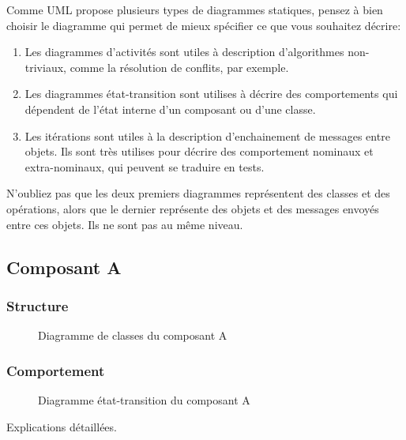 Comme UML propose plusieurs types de diagrammes statiques, pensez à bien choisir le diagramme qui permet de mieux spécifier ce que vous souhaitez décrire:
\begin{enumerate}
	\item Les diagrammes d'activités sont utiles à description d'algorithmes non-triviaux, comme la résolution de conflits, par exemple.
	\item Les diagrammes état-transition sont utilises à décrire des comportements qui dépendent de l'état interne d'un composant ou d'une classe.
	\item Les itérations sont utiles à la description d'enchainement de messages entre objets. Ils sont très utilises pour décrire des comportement nominaux et extra-nominaux, qui peuvent se traduire en tests.
\end{enumerate}

N'oubliez pas que les deux premiers diagrammes représentent des classes et des opérations, alors que le dernier représente des objets et des messages envoyés entre ces objets. Ils ne sont pas au même niveau. 



\subsection{Composant A}

\subsubsection{Structure}


\begin{figure}[!htbp]
\begin{center}

\caption{Diagramme de classes du composant A}
\end{center}
\end{figure}
 
\subsubsection{Comportement}

\begin{figure}[!htbp]
\begin{center}
\caption{Diagramme état-transition du composant A}
\end{center}
\end{figure}

Explications détaillées.

